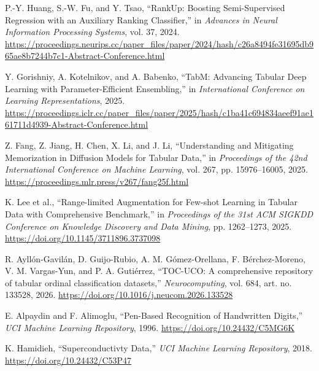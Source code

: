  P.-Y. Huang, S.-W. Fu, and Y. Tsao, ``RankUp: Boosting Semi-Supervised Regression with an Auxiliary Ranking Classifier,'' in \textit{Advances in Neural Information Processing Systems}, vol. 37, 2024. \url{https://proceedings.neurips.cc/paper_files/paper/2024/hash/c26a8494fe31695db965ae8b7244b7c1-Abstract-Conference.html}

 Y. Gorishniy, A. Kotelnikov, and A. Babenko, ``TabM: Advancing Tabular Deep Learning with Parameter-Efficient Ensembling,'' in \textit{International Conference on Learning Representations}, 2025. \url{https://proceedings.iclr.cc/paper_files/paper/2025/hash/c1ba41c694834aeef91ae161711d4939-Abstract-Conference.html}

 Z. Fang, Z. Jiang, H. Chen, X. Li, and J. Li, ``Understanding and Mitigating Memorization in Diffusion Models for Tabular Data,'' in \textit{Proceedings of the 42nd International Conference on Machine Learning}, vol. 267, pp. 15976--16005, 2025. \url{https://proceedings.mlr.press/v267/fang25f.html}

 K. Lee et al., ``Range-limited Augmentation for Few-shot Learning in Tabular Data with Comprehensive Benchmark,'' in \textit{Proceedings of the 31st ACM SIGKDD Conference on Knowledge Discovery and Data Mining}, pp. 1262--1273, 2025. \url{https://doi.org/10.1145/3711896.3737098}

 R. Ayllón-Gavilán, D. Guijo-Rubio, A. M. Gómez-Orellana, F. Bérchez-Moreno, V. M. Vargas-Yun, and P. A. Gutiérrez, ``TOC-UCO: A comprehensive repository of tabular ordinal classification datasets,'' \textit{Neurocomputing}, vol. 684, art. no. 133528, 2026. \url{https://doi.org/10.1016/j.neucom.2026.133528}

 E. Alpaydin and F. Alimoglu, ``Pen-Based Recognition of Handwritten Digits,'' \textit{UCI Machine Learning Repository}, 1996. \url{https://doi.org/10.24432/C5MG6K}

 K. Hamidieh, ``Superconductivty Data,'' \textit{UCI Machine Learning Repository}, 2018. \url{https://doi.org/10.24432/C53P47}

